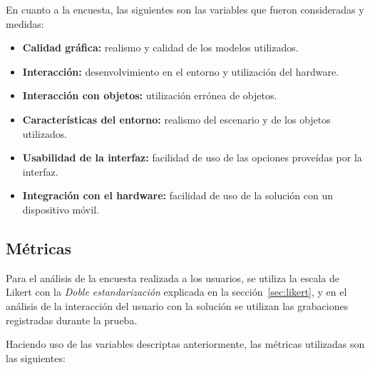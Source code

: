 En cuanto a la encuesta, las siguientes son las variables que fueron consideradas 
y medidas:

\begin{itemize}

\item \textbf{Calidad gráfica:} realismo y calidad de los modelos utilizados.

\item \textbf{Interacción:} desenvolvimiento en el entorno y utilización del 
    hardware.

\item \textbf{Interacción con objetos:} utilización errónea de objetos.

\item \textbf{Características del entorno:} realismo del escenario y de los 
    objetos utilizados.

\item \textbf{Usabilidad de la interfaz:} facilidad de uso de las opciones 
    proveídas por la interfaz.

\item \textbf{Integración con el hardware:} facilidad de uso de la solución con 
    un dispositivo móvil. 

\end{itemize}

\subsection{Métricas}

Para el análisis de la encuesta realizada a los usuarios, se utiliza la escala
de Likert con la \emph{Doble estandarización} explicada en la
sección~\ref{sec:likert}, y en el análisis de la interacción del usuario con la
solución se utilizan las grabaciones registradas durante la prueba.

Haciendo uso de las variables descriptas anteriormente, las métricas
utilizadas son las siguientes:

